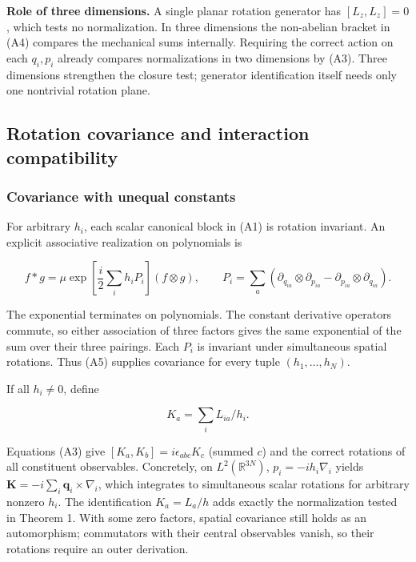 \documentclass[11pt,a4paper]{article}
\begin{document}
\textbf{Role of three dimensions.} A single planar rotation generator
has \([L_z,L_z]=0\), which tests no normalization. In three dimensions
the non-abelian bracket in (A4) compares the mechanical sums internally.
Requiring the correct action on each \(q_i,p_i\) already compares
normalizations in two dimensions by (A3). Three dimensions strengthen
the closure test; generator identification itself needs only one
nontrivial rotation plane.

\hypertarget{rotation-covariance-and-interaction-compatibility}{%
\subsection{Rotation covariance and interaction
compatibility}\label{rotation-covariance-and-interaction-compatibility}}

\hypertarget{covariance-with-unequal-constants}{%
\subsubsection{Covariance with unequal
constants}\label{covariance-with-unequal-constants}}

For arbitrary \(h_i\), each scalar canonical block in (A1) is rotation
invariant. An explicit associative realization on polynomials is

\[
f*g=\mu\exp\left[\frac i2\sum_i h_i P_i\right] (f\otimes g),\qquad
P_i=\sum_a\left(\partial_{q_{ia}}\otimes\partial_{p_{ia}}
-\partial_{p_{ia}}\otimes\partial_{q_{ia}}\right). \tag{A5}
\]

The exponential terminates on polynomials. The constant derivative
operators commute, so either association of three factors gives the same
exponential of the sum over their three pairings. Each \(P_i\) is
invariant under simultaneous spatial rotations. Thus (A5) supplies
covariance for every tuple \((h_1,\ldots,h_N)\).

If all \(h_i\ne0\), define

\[
K_a=\sum_i L_{ia}/h_i.
\]

Equations (A3) give \([K_a,K_b]=i\epsilon_{abc}K_c\) (summed \(c\)) and
the correct rotations of all constituent observables. Concretely, on
\(L^2(\mathbb R^{3N})\), \(p_i=-ih_i\nabla_i\) yields
\(\mathbf K=-i\sum_i\mathbf q_i\times\nabla_i\), which integrates to
simultaneous scalar rotations for arbitrary nonzero \(h_i\). The
identification \(K_a=L_a/h\) adds exactly the normalization tested in
Theorem 1. With some zero factors, spatial covariance still holds as an
automorphism; commutators with their central observables vanish, so
their rotations require an outer derivation.
\end{document}
